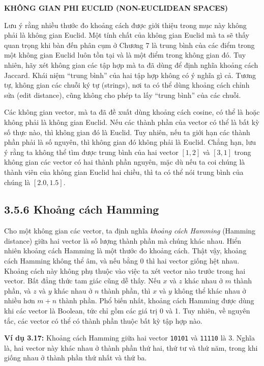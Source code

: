 \begin{framed}
\textbf{KHÔNG GIAN PHI EUCLID (NON-EUCLIDEAN SPACES)}

Lưu ý rằng nhiều thước đo khoảng cách được giới thiệu trong mục này không phải là không gian Euclid. Một tính chất của không gian Euclid mà ta sẽ thấy quan trọng khi bàn đến phân cụm ở Chương 7 là trung bình của các điểm trong một không gian Euclid luôn tồn tại và là một điểm trong không gian đó. Tuy nhiên, hãy xét không gian các tập hợp mà ta đã dùng để định nghĩa khoảng cách Jaccard. Khái niệm ``trung bình'' của hai tập hợp không có ý nghĩa gì cả. Tương tự, không gian các chuỗi ký tự (strings), nơi ta có thể dùng khoảng cách chỉnh sửa (edit distance), cũng không cho phép ta lấy ``trung bình'' của các chuỗi.

Các không gian vector, mà ta đã đề xuất dùng khoảng cách cosine, có thể là hoặc không phải là không gian Euclid. Nếu các thành phần của vector có thể là bất kỳ số thực nào, thì không gian đó là Euclid. Tuy nhiên, nếu ta giới hạn các thành phần phải là số nguyên, thì không gian đó không phải là Euclid. Chẳng hạn, lưu ý rằng ta không thể tìm được trung bình của hai vector $[1,2]$ và $[3,1]$ trong không gian các vector có hai thành phần nguyên, mặc dù nếu ta coi chúng là thành viên của không gian Euclid hai chiều, thì ta có thể nói trung bình của chúng là $[2.0, 1.5]$.
\end{framed}

\subsection*{3.5.6 Khoảng cách Hamming}

Cho một không gian các vector, ta định nghĩa \emph{khoảng cách Hamming} (Hamming distance) giữa hai vector là số lượng thành phần mà chúng khác nhau. Hiển nhiên khoảng cách Hamming là một thước đo khoảng cách. Thật vậy, khoảng cách Hamming không thể âm, và nếu bằng 0 thì hai vector giống hệt nhau. Khoảng cách này không phụ thuộc vào việc ta xét vector nào trước trong hai vector. Bất đẳng thức tam giác cũng dễ thấy. Nếu $x$ và $z$ khác nhau ở $m$ thành phần, và $z$ và $y$ khác nhau ở $n$ thành phần, thì $x$ và $y$ không thể khác nhau ở nhiều hơn $m+n$ thành phần. Phổ biến nhất, khoảng cách Hamming được dùng khi các vector là Boolean, tức chỉ gồm các giá trị 0 và 1. Tuy nhiên, về nguyên tắc, các vector có thể có thành phần thuộc bất kỳ tập hợp nào.

\textbf{Ví dụ 3.17:} Khoảng cách Hamming giữa hai vector \texttt{10101} và \texttt{11110} là 3. Nghĩa là, hai vector này khác nhau ở thành phần thứ hai, thứ tư và thứ năm, trong khi giống nhau ở thành phần thứ nhất và thứ ba.

